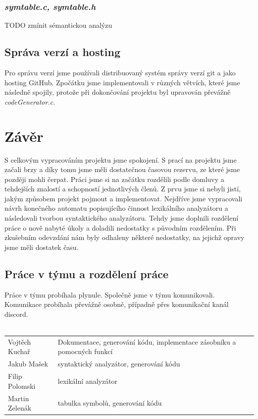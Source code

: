 \documentclass{article}
\begin{document}
\subsubsection{\emph{symtable.c, symtable.h}}
TODO zmínit sémantickou analýzu\\

\subsection{Správa verzí a hosting}
Pro správu verzí jsme používali distribuovaný systém správy verzí git a jako hosting GitHub. Zpočátku jsme implementovali v různých větvích, které jsme následně spojily, protože při dokončování projektu byl upravován převážně \emph{codeGenerator.c}. 

\section{Závěr}
S celkovým vypracováním projektu jsme spokojení. S prací na projektu jsme začali brzy a díky tomu jsme měli dostatečnou časovou rezervu, ze které jsme později mohli čerpat. Práci jsme si na začátku rozdělili podle domluvy a tehdejších znalostí a schopností jednotlivých členů. Z prvu jsme si nebyli jistí, jakým způsobem projekt pojmout a implementovat. Nejdříve jsme vypracovali návrh konečného automatu popisujícího činnost lexikálního analyzátoru a následovali tvorbou syntaktického analyzátoru. Tehdy jsme doplnili rozdělení práce o nově nabyté úkoly a doladili nedostatky s původním rozdělením. Při zkušebním odevzdání nám byly odhaleny některé nedostatky, na jejichž opravy jsme měli dostatek času.\\

\subsection{Práce v týmu a rozdělení práce}
Práce v týmu probíhala plynule. Společně jsme v týmu komunikovali. Komunikace probíhala převážně osobně, případně přes komunikační kanál discord.\\\\
\begin{tabular}{l l}
Vojtěch Kuchař & Dokumentace, generování kódu, implementace zásobníku a pomocných funkcí\\
Jakub Mašek & syntaktický analyzátor, generování kódu\\
Filip Polomski & lexikální analyzátor\\
Martin Zelenák & tabulka symbolů, generování kódu\\
\end{tabular}
\end{document}
